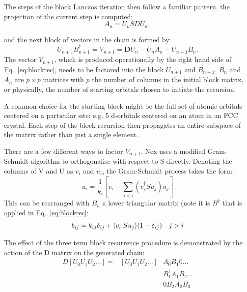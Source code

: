 The steps of the block Lanczos iteration then follow a familiar pattern.
the projection of the current step is computed:
%
\begin{equation}
A_{n} = U_{n}SDU_{n},
\end{equation}

and the next block of vectors in the chain is formed by: 
%
\begin{equation}
\label{eq:blockrec}
U_{n+1}B^{\dagger}_{n+1} = V_{n+1} = \mathbf{D}U_{n} - U_{n}A_{n} - U_{n-1}B_{n}.
\end{equation}
%
The vector $V_{n+1}$, which is produced operationally by the right hand
side of Eq.~\ref{eq:blockrec}, needs to be factored into the block
$U_{n+1}$ and $B_{n+1}$. $B_{n}$ and $A_{n}$ are $p\times p$ 
matrices with $p$ the number of columns in the initial block matrix, or
physically, the number of starting orbitals chosen to
initiate the recursion. 

A common choice for the starting block
might be the full set of atomic orbitals centered on a particular 
site: e.g. 5 d-orbitals centered on an atom in an FCC crystal. 
Each step of the block recursion then propagates an entire subspace of
the matrix rather than just a single element.

There are a few different ways to factor $V_{n+1}$. Nex
uses a modified Gram-Schmidt algorithm to orthogonalise 
with respect to S directly. Denoting the columns of V and U
as $v_{i}$ and $u_{i}$, the Gram-Schmidt process takes the
form:
%
\begin{equation}
u_{i} = \frac{1}{k_{i}}[v_{i} - \sum_{j < i}(v^{\dagger}_{i}Su_{j})u_{j}]
\end{equation}
%
This can be rearranged with $B_{n}$ a lower triangular matrix (note it is $B^{\dagger}$
that is applied in Eq.~\ref{eq:blockrec}:
%
\begin{equation}
b_{ij} = k_{ij}\delta_{ij} + \langle v_{i}|Su_{j}\rangle (1-\delta_{ij}) \quad j>i
\end{equation}

The effect of the three term block recurrence procedure
is demonstrated by the action of the D matrix on the 
generated chain:
%
\begin{align}
D[U_{0}U_{1}U_{2}...] = &[U_{0}U_{1}U_{2}...]& A_{0} B_{1} 0  ...             \\
                        &                    & B_{1}^{\dagger} A_{1} B_{2} ... \\
                        &                    & 0     B_{2} A_{2} B_{3}
\end{align}
%

